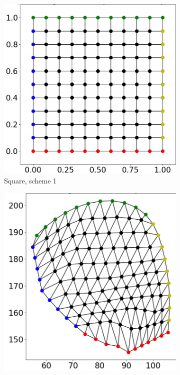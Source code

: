 \begin{figure}
  \begin{subfigure}[t]{0.24\textwidth}%
    \centering%
    \includegraphics[width=\textwidth]{images/fiber_creation/quad_1.png}%
    \caption{Square, scheme 1}%
    \label{fig:tquad_1}%
  \end{subfigure}
  \begin{subfigure}[t]{0.24\textwidth}%
    \centering%
    \includegraphics[width=\textwidth, trim=26mm 14mm 6mm 6mm, clip]{images/fiber_creation/mesh_plots/out_0_1_0_w.png}%

\end{subfigure}
\end{figure}
